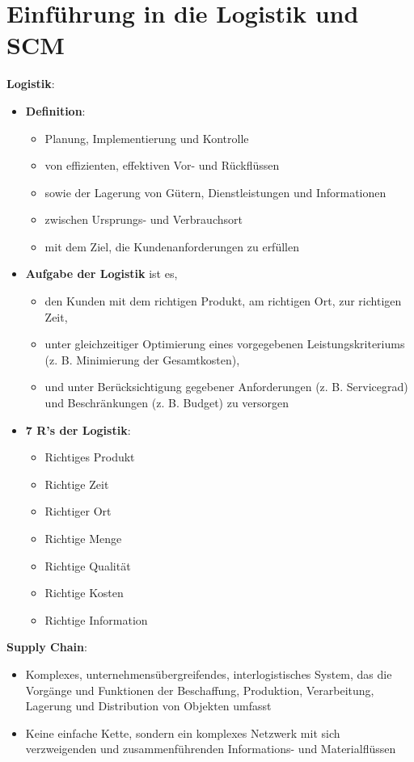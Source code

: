 \section{Einführung in die Logistik und SCM}

\textbf{Logistik}:
\begin{itemize}
	\item \textbf{Definition}: 
	\begin{itemize}
		\item Planung, Implementierung und Kontrolle 
		\item von effizienten, effektiven Vor- und Rückflüssen 
		\item sowie der Lagerung von Gütern, Dienstleistungen und Informationen 
		\item zwischen Ursprungs- und Verbrauchsort 
		\item mit dem Ziel, die Kundenanforderungen zu erfüllen
	\end{itemize}
	\item \textbf{Aufgabe der Logistik} ist es,
	\begin{itemize}
		\item den Kunden mit dem richtigen Produkt, am richtigen Ort, zur richtigen Zeit,
		\item unter gleichzeitiger Optimierung eines vorgegebenen Leistungskriteriums (z. B.
		Minimierung der Gesamtkosten),
		\item und unter Berücksichtigung gegebener Anforderungen (z. B. Servicegrad) und
		Beschränkungen (z. B. Budget) zu versorgen
	\end{itemize}
	\item \textbf{7 R's der Logistik}:
	\begin{itemize}
		\item Richtiges Produkt
		\item Richtige Zeit
		\item Richtiger Ort
		\item Richtige Menge
		\item Richtige Qualität
		\item Richtige Kosten
		\item Richtige Information
	\end{itemize}
\end{itemize}
\bigskip
\textbf{Supply Chain}: 
\begin{itemize}
	\item Komplexes, unternehmensübergreifendes, interlogistisches System, das die Vorgänge und Funktionen der Beschaffung, Produktion, Verarbeitung, Lagerung und Distribution von Objekten umfasst
	\item Keine einfache Kette, sondern ein komplexes Netzwerk mit sich verzweigenden und zusammenführenden Informations- und Materialflüssen
\end{itemize}
